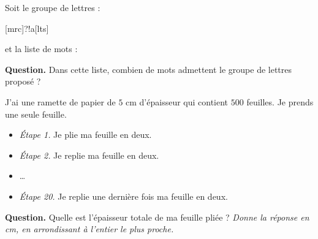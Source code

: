 \documentclass[class=report,crop=false, 12pt]{standalone}
\begin{document}
\begin{enigme}

Soit le groupe de lettres :

\centerline{[mrc]?!a[lts]}

et la liste de mots :

\centerline{\qquad{}\qquad{}\qquad{}\qquad{}}

\centerline{\qquad{}\qquad{}\qquad{}\qquad{}}
 
 \centerline{\qquad{}\qquad{}\qquad{}\qquad{}}
 
\bigskip

\textbf{Question.} Dans cette liste, combien de mots admettent le groupe de lettres proposé ?


\end{enigme}


\begin{enigme}[Puissances de 2]

J'ai une ramette de papier de $5$ cm d'épaisseur qui contient $500$ feuilles.
Je prends une seule feuille.

\begin{itemize}
  \item \emph{Étape 1.} Je plie ma feuille en deux.
  \item \emph{Étape 2.} Je replie ma feuille en deux.
  \item \ldots
  \item \emph{Étape 20.} Je replie une dernière fois ma feuille en deux.
\end{itemize}
    
\bigskip

\textbf{Question.} Quelle est l'épaisseur totale de ma feuille pliée ?
\emph{Donne la réponse en cm, en arrondissant à l'entier le plus proche.}



\end{enigme}
\end{document}
